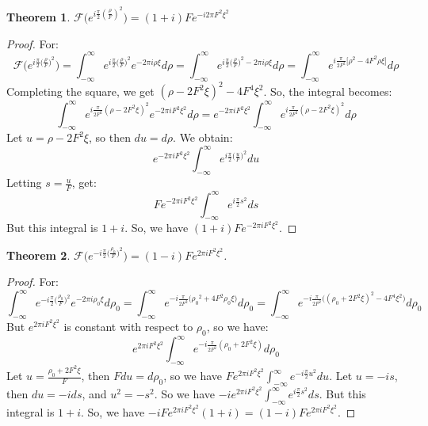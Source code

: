 \documentclass{article}
\theoremstyle{mystyle}
\newtheorem{theorem}{Theorem}[section]
\begin{document}
\begin{theorem}
$\mathcal{F}\big(e^{i\frac{\pi}{2}(\frac{\rho}{F})^2}\big) = (1+i)Fe^{-i2\pi F^2 \xi^2}$
\end{theorem}
\begin{proof}
For:
\begin{equation*}
    \mathcal{F}\big(e^{i\frac{\pi}{2} \big(\frac{\rho}{F}\big)^2}\big) = \int_{-\infty}^{\infty} e^{i\frac{\pi}{2}\big(\frac{\rho}{F}\big)^2}e^{-2\pi i \rho \xi}d\rho = \int_{-\infty}^{\infty} e^{i\frac{\pi}{2}\big(\frac{\rho}{F}\big)^2-2\pi i \rho \xi}d\rho = \int_{-\infty}^{\infty} e^{i\frac{\pi}{2F^2}\big[\rho^2-4F^2\rho \xi\big]}d\rho    
\end{equation*}
Completing the square, we get $(\rho - 2F^2 \xi)^2 - 4F^4\xi^2$. So, the integral becomes:
\begin{equation*}
    \int_{-\infty}^{\infty} e^{i\frac{\pi}{2F^2}(\rho - 2F^2\xi)^2}e^{-2\pi i F^2 \xi^2}d\rho = e^{-2\pi i F^2 \xi^2}\int_{-\infty}^{\infty} e^{i\frac{\pi}{2F^2}(\rho - 2F^2\xi)^2}d\rho
\end{equation*}
Let $u = \rho - 2F^2\xi$, so then $du = d\rho$. We obtain:
\begin{equation*}
    e^{-2\pi i F^2 \xi^2}\int_{-\infty}^{\infty} e^{i\frac{\pi}{2}\big(\frac{u}{F}\big)^2}du
\end{equation*}
Letting $s = \frac{u}{F}$, get:
\begin{equation*}
Fe^{-2\pi i F^2 \xi^2} \int_{-\infty}^{\infty} e^{i\frac{\pi}{2}s^2}ds
\end{equation*}
But this integral is $1+i$. So, we have $(1+i)Fe^{-2\pi i F^2 \xi^2}$.
\end{proof}
\begin{theorem}
$\mathcal{F}(e^{-i\frac{\pi}{2}\big(\frac{\rho_0}{F}\big)^2}\big) = (1-i)Fe^{2\pi i F^2 \xi^2}$.
\end{theorem}
\begin{proof}
For:
\begin{equation*}
    \int_{-\infty}^{\infty} e^{-i\frac{\pi}{2}\big(\frac{\rho_0}{F}\big)^2}e^{-2\pi i \rho_0 \xi}d\rho_0 = \int_{-\infty}^{\infty} e^{-i\frac{\pi}{2F^2}\big({\rho_0}^2 + 4F^2 \rho_0 \xi\big)}d\rho_0 = \int_{-\infty}^{\infty} e^{-i\frac{\pi}{2F^2}\big((\rho_0+2F^2\xi)^2 - 4F^4\xi^2\big)}d\rho_0
\end{equation*}
But $e^{2\pi i F^2 \xi^2}$ is constant with respect to $\rho_0$, so we have:
\begin{equation*}
    e^{2\pi i F^2 \xi^2} \int_{-\infty}^{\infty} e^{-i\frac{\pi}{2F^2}(\rho_0+2F^2\xi)}d\rho_0    
\end{equation*}
Let $u = \frac{\rho_0 + 2F^2 \xi}{F}$, then $Fdu = d\rho_0$, so we have $Fe^{2\pi i F^2 \xi^2} \int_{-\infty}^{\infty} e^{-i\frac{\pi}{2}u^2}du$. Let $u = -is$, then $du = -ids$, and $u^2 = -s^2$. So we have $-i e^{2\pi i F^2 \xi^2}\int_{-\infty}^{\infty} e^{i\frac{\pi}{2}s^2}ds$. But this integral is $1+i$. So, we have $-iFe^{2\pi i F^2 \xi^2}(1+i) = (1-i)Fe^{2\pi i F^2 \xi^2}$.
\end{proof} 
\end{document}
